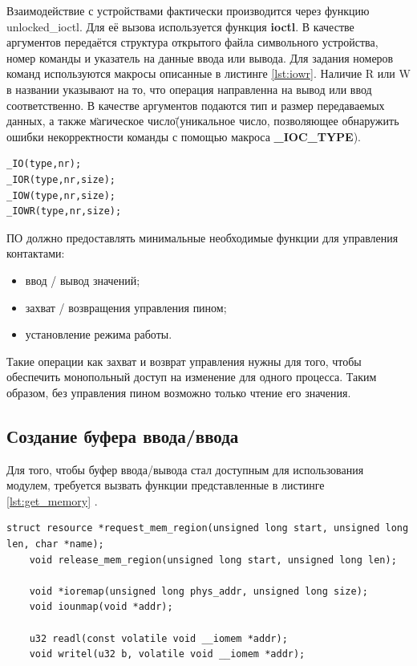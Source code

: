 Взаимодействие с устройствами фактически производится через функцию unlocked\_ioctl. Для её вызова используется функция \textbf{ioctl}. В качестве аргументов передаётся структура открытого файла символьного устройства, номер команды и указатель на данные ввода или вывода. Для задания номеров команд используются макросы описанные в листинге \ref{lst:iowr}. Наличие R или W в названии указывают на то, что операция направленна на вывод или ввод соответственно. В качестве аргументов подаются тип и размер передаваемых данных, а также \"магическое число\" (уникальное число, позволяющее обнаружить ошибки некорректности команды с помощью макроса \textbf{\_IOC\_TYPE}).

\begin{lstlisting}[caption = {Макросы команд ioctl}, label=lst:iowr]
_IO(type,nr);
_IOR(type,nr,size);
_IOW(type,nr,size);
_IOWR(type,nr,size);
\end{lstlisting}

ПО должно предоставлять минимальные необходимые функции для управления контактами:
\begin{itemize}
	\item ввод / вывод значений;
	\item захват / возвращения управления пином;
	\item установление режима работы.
\end{itemize} 

Такие операции как захват и возврат управления нужны для того, чтобы обеспечить монопольный доступ на изменение для одного процесса. Таким образом, без управления пином возможно только чтение его значения.

\subsection{Создание буфера ввода/ввода}
Для того, чтобы буфер ввода/вывода стал доступным для использования модулем, требуется вызвать функции представленные в листинге \ref{lst:get_memory} \cite{subj:memory}.

\begin{lstlisting}[caption = {Получение доступа к буферу памяти в ядре}, label=lst:get_memory]
	struct resource *request_mem_region(unsigned long start, unsigned long len, char *name);
	void release_mem_region(unsigned long start, unsigned long len);
	
	void *ioremap(unsigned long phys_addr, unsigned long size);
	void iounmap(void *addr);
	
	u32 readl(const volatile void __iomem *addr);
	void writel(u32 b, volatile void __iomem *addr);
\end{lstlisting}

